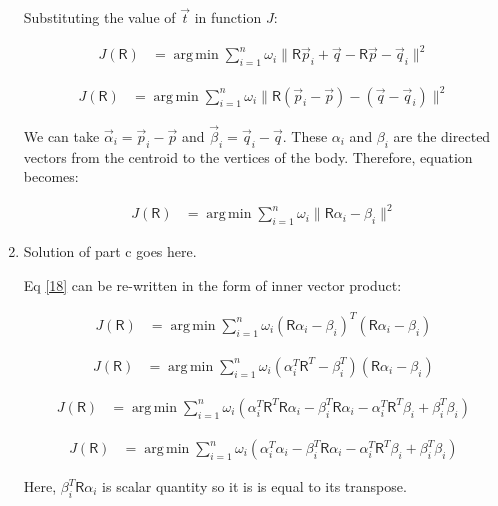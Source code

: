 \documentclass[a4paper, 11pt]{article}
\newcommand{\mat}[1]{\boldsymbol { \mathsf{#1}} }
\DeclareMathOperator*{\argmin}{arg\,min}
\newcommand{\norm}[1]{\lVert#1\rVert}
\begin{document}
\begin{enumerate}[label=\alph*.]
    Substituting the value of $\vec t$ in function $J$:
    
    \begin{align}
  J(\mat R) &= \argmin\sum_{i=1}^{n}\omega_i\norm{\mat R\vec p_i+ \vec q - \mat R \vec p -\vec q_i}^2
    \end{align}
    
    \begin{align}
  J(\mat R) &= \argmin\sum_{i=1}^{n}\omega_i\norm{\mat R (\vec p_i - \vec p) - (\vec q -\vec q_i)}^2
    \end{align}
    
    We can take $\vec \alpha_i = \vec p_i - \vec p$ and $\vec \beta_i = \vec q_i - \vec q$. These $\alpha_i$ and $\beta_i$ are the directed vectors from the centroid to the vertices of the body. Therefore, equation becomes:
    
    \begin{align}
  J(\mat R) &= \argmin\sum_{i=1}^{n}\omega_i\norm{\mat R \alpha_i - \beta_i}^2 \label{18}
    \end{align}
    
    \item
    Solution of part c goes here.
    
    Eq \eqref{18} can be re-written in the form of inner vector product:
    
    \begin{align}
  J(\mat R) &= \argmin\sum_{i=1}^{n}\omega_i (\mat R \alpha_i - \beta_i)^T(\mat R \alpha_i - \beta_i)
    \end{align}
    
    \begin{align}
  J(\mat R) &= \argmin\sum_{i=1}^{n}\omega_i (\alpha_i^T \mat R^T - \beta_i^T)(\mat R \alpha_i - \beta_i)
    \end{align}
    
    \begin{align}
  J(\mat R) &= \argmin\sum_{i=1}^{n}\omega_i (\alpha_i^T \mat R^T \mat R \alpha_i - \beta_i^T \mat R \alpha_i -  \alpha_i^T \mat R^T \beta_i + \beta_i^T \beta_i )
    \end{align}
    
    \begin{align}
  J(\mat R) &= \argmin\sum_{i=1}^{n}\omega_i (\alpha_i^T \alpha_i - \beta_i^T \mat R \alpha_i -  \alpha_i^T \mat R^T \beta_i + \beta_i^T \beta_i )\label{22}
    \end{align}
    
    Here, $\beta_i^T \mat R \alpha_i$ is scalar quantity so it is is equal to its transpose.
    

\end{enumerate}
\end{document}
